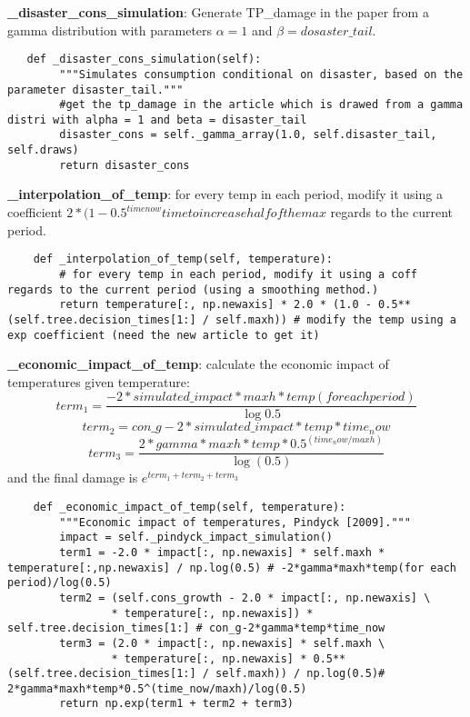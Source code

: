 \documentclass[12pt]{article}
\begin{document}
\textbf{\_disaster\_cons\_simulation}: Generate TP\_damage in the paper from a gamma distribution with parameters $ \alpha = 1 $ and $\beta = dosaster\_tail$.
\begin{verbatim}
   def _disaster_cons_simulation(self):
        """Simulates consumption conditional on disaster, based on the parameter disaster_tail."""
        #get the tp_damage in the article which is drawed from a gamma distri with alpha = 1 and beta = disaster_tail
        disaster_cons = self._gamma_array(1.0, self.disaster_tail, self.draws)
        return disaster_cons
\end{verbatim}


\textbf{\_interpolation\_of\_temp}: for every temp in each period, modify it using a coefficient $2*(1-0.5^{time now}{time to increase half of the max}$ regards to the current period.
\begin{verbatim}
    def _interpolation_of_temp(self, temperature):
    	# for every temp in each period, modify it using a coff regards to the current period (using a smoothing method.)
        return temperature[:, np.newaxis] * 2.0 * (1.0 - 0.5**(self.tree.decision_times[1:] / self.maxh)) # modify the temp using a exp coefficient (need the new article to get it)
\end{verbatim}


\textbf{\_economic\_impact\_of\_temp}: calculate the economic impact of temperatures given temperature:
  \begin{equation*}
   term_1 = \frac{-2*simulated\_impact*maxh*temp(for each period)}{\log{0.5}}
  \end{equation*}
  \begin{equation*}
   term_2 = con\_g-2*simulated\_impact*temp*time_now
  \end{equation*}
  \begin{equation*}
   term_3 = \frac{2*gamma*maxh*temp*0.5^(time_now/maxh)}{\log(0.5)}
  \end{equation*}
and the final damage is $e^{term_1 + term_2+term_3}$

\begin{verbatim}
    def _economic_impact_of_temp(self, temperature):
        """Economic impact of temperatures, Pindyck [2009]."""
        impact = self._pindyck_impact_simulation()
        term1 = -2.0 * impact[:, np.newaxis] * self.maxh * temperature[:,np.newaxis] / np.log(0.5) # -2*gamma*maxh*temp(for each period)/log(0.5)
        term2 = (self.cons_growth - 2.0 * impact[:, np.newaxis] \
                * temperature[:, np.newaxis]) * self.tree.decision_times[1:] # con_g-2*gamma*temp*time_now
        term3 = (2.0 * impact[:, np.newaxis] * self.maxh \
                * temperature[:, np.newaxis] * 0.5**(self.tree.decision_times[1:] / self.maxh)) / np.log(0.5)# 2*gamma*maxh*temp*0.5^(time_now/maxh)/log(0.5)
        return np.exp(term1 + term2 + term3)
\end{verbatim}
\end{document}
